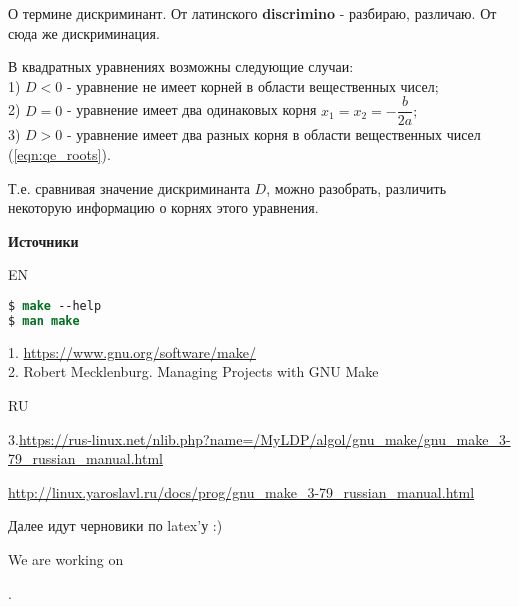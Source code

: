 О термине дискриминант. От латинского \textbf{discrimino} - разбираю, различаю. От сюда же дискриминация.

В квадратных уравнениях возможны следующие случаи:\\
1) $ D < 0 $ - уравнение не имеет корней в области вещественных чисел;  \\
2) $ D = 0 $ - уравнение имеет два одинаковых корня $ x_1=x_2=-\dfrac{b}{2a}; $ \\
3) $ D > 0 $ - уравнение имеет два разных корня в области вещественных чисел (\ref{eqn:qe_roots}).

Т.е. сравнивая значение дискриминанта $D$, можно разобрать, различить некоторую информацию о корнях этого уравнения.

\clearpage

\textbf{Источники}

EN

\begin{lstlisting}[language=csh]
$ make --help
$ man make
\end{lstlisting}

1. \href{https://www.gnu.org/software/make/}{https://www.gnu.org/software/make/}  \\
2. Robert Mecklenburg. Managing Projects with GNU Make

RU

3.\href{https://rus-linux.net/nlib.php?name=/MyLDP/algol/gnu_make/gnu_make_3-79_russian_manual.html}{https://rus-linux.net/nlib.php?name=/MyLDP/algol/gnu\_make/gnu\_make\_3-79\_russian\_manual.html}

\href{http://linux.yaroslavl.ru/docs/prog/gnu_make_3-79_russian_manual.html}{http://linux.yaroslavl.ru/docs/prog/gnu\_make\_3-79\_russian\_manual.html}

\clearpage

Далее идут черновики по latex'у :)





We are working on
.

